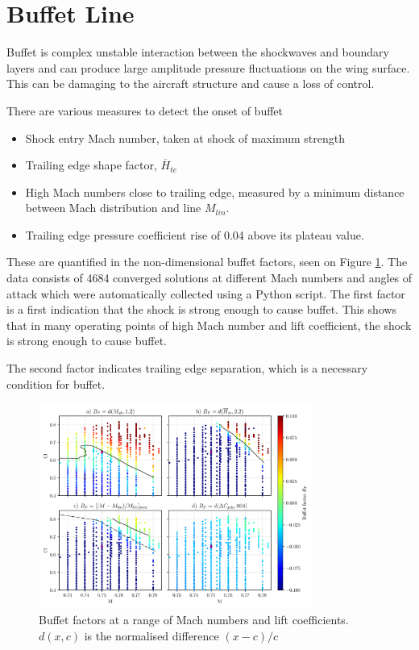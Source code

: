 \documentclass[11pt]{article}
\begin{document}
\section{Buffet Line}

Buffet is complex unstable interaction between the shockwaves and boundary layers and can produce large amplitude pressure fluctuations on the wing surface.
This can be damaging to the aircraft structure and cause a loss of control.

There are various measures to detect the onset of buffet
\begin{itemize}
    \item Shock entry Mach number, taken at shock of maximum strength
    \item Trailing edge shape factor, $\overline{H}_{te}$
    \item High Mach numbers close to trailing edge, measured by a minimum distance between Mach distribution and line $M_{lin}$.
    \item Trailing edge pressure coefficient rise of 0.04 above its plateau value.
\end{itemize}
These are quantified in the non-dimensional buffet factors, seen on Figure \ref{fig:buffet_classification}.
The data consists of 4684 converged solutions at different Mach numbers and angles of attack which were automatically collected using a Python script.
The first factor is a first indication that the shock is strong enough to cause buffet.
This shows that in many operating points of high Mach number and lift coefficient, the shock is strong enough to cause buffet.

The second factor indicates trailing edge separation, which is a necessary condition for buffet.

\begin{figure}
    \centering
    \includegraphics[width=0.8\textwidth]{figures/buffet_classification.png}
    \caption{Buffet factors at a range of Mach numbers and lift coefficients. $d(x,c)$ is the normalised difference $(x-c)/c$}
    \label{fig:buffet_classification}
\end{figure}
\end{document}
